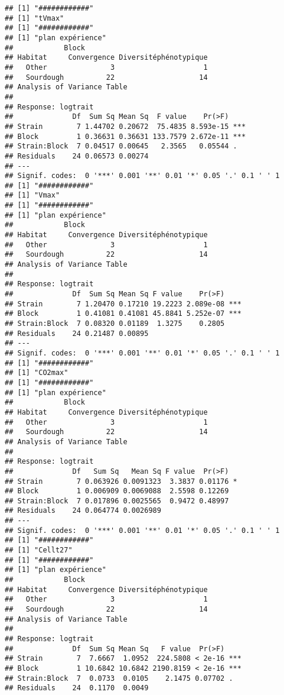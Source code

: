 \documentclass[
]{article}
\begin{document}
\begin{verbatim}
## [1] "############"
## [1] "tVmax"
## [1] "############"
## [1] "plan expérience"
##            Block
## Habitat     Convergence Diversitéphénotypique
##   Other               3                     1
##   Sourdough          22                    14
## Analysis of Variance Table
## 
## Response: logtrait
##              Df  Sum Sq Mean Sq  F value    Pr(>F)    
## Strain        7 1.44702 0.20672  75.4835 8.593e-15 ***
## Block         1 0.36631 0.36631 133.7579 2.672e-11 ***
## Strain:Block  7 0.04517 0.00645   2.3565   0.05544 .  
## Residuals    24 0.06573 0.00274                       
## ---
## Signif. codes:  0 '***' 0.001 '**' 0.01 '*' 0.05 '.' 0.1 ' ' 1
## [1] "############"
## [1] "Vmax"
## [1] "############"
## [1] "plan expérience"
##            Block
## Habitat     Convergence Diversitéphénotypique
##   Other               3                     1
##   Sourdough          22                    14
## Analysis of Variance Table
## 
## Response: logtrait
##              Df  Sum Sq Mean Sq F value    Pr(>F)    
## Strain        7 1.20470 0.17210 19.2223 2.089e-08 ***
## Block         1 0.41081 0.41081 45.8841 5.252e-07 ***
## Strain:Block  7 0.08320 0.01189  1.3275    0.2805    
## Residuals    24 0.21487 0.00895                      
## ---
## Signif. codes:  0 '***' 0.001 '**' 0.01 '*' 0.05 '.' 0.1 ' ' 1
## [1] "############"
## [1] "CO2max"
## [1] "############"
## [1] "plan expérience"
##            Block
## Habitat     Convergence Diversitéphénotypique
##   Other               3                     1
##   Sourdough          22                    14
## Analysis of Variance Table
## 
## Response: logtrait
##              Df   Sum Sq   Mean Sq F value  Pr(>F)  
## Strain        7 0.063926 0.0091323  3.3837 0.01176 *
## Block         1 0.006909 0.0069088  2.5598 0.12269  
## Strain:Block  7 0.017896 0.0025565  0.9472 0.48997  
## Residuals    24 0.064774 0.0026989                  
## ---
## Signif. codes:  0 '***' 0.001 '**' 0.01 '*' 0.05 '.' 0.1 ' ' 1
## [1] "############"
## [1] "Cellt27"
## [1] "############"
## [1] "plan expérience"
##            Block
## Habitat     Convergence Diversitéphénotypique
##   Other               3                     1
##   Sourdough          22                    14
## Analysis of Variance Table
## 
## Response: logtrait
##              Df  Sum Sq Mean Sq   F value  Pr(>F)    
## Strain        7  7.6667  1.0952  224.5808 < 2e-16 ***
## Block         1 10.6842 10.6842 2190.8159 < 2e-16 ***
## Strain:Block  7  0.0733  0.0105    2.1475 0.07702 .  
## Residuals    24  0.1170  0.0049                      

\end{verbatim}
\end{document}
